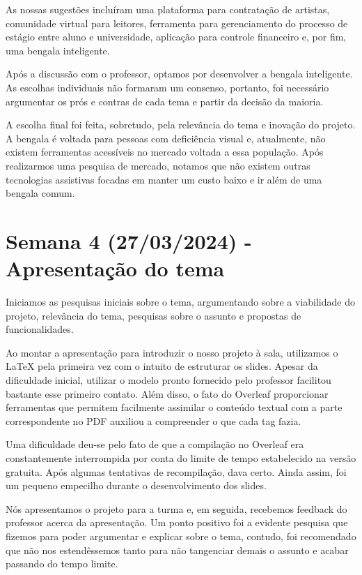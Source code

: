As nossas sugestões incluíram uma plataforma para contratação de artistas, comunidade virtual para leitores, ferramenta para gerenciamento do processo de estágio entre aluno e universidade, aplicação para controle financeiro e, por fim, uma bengala inteligente.

Após a discussão com o professor, optamos por desenvolver a bengala inteligente. As escolhas individuais não formaram um consenso, portanto, foi necessário argumentar os prós e contras de cada tema e partir da decisão da maioria.

A escolha final foi feita, sobretudo, pela relevância do tema e inovação do projeto. A bengala é voltada para pessoas com deficiência visual e, atualmente, não existem ferramentas acessíveis no mercado voltada a essa população. Após realizarmos uma pesquisa de mercado, notamos que não existem outras tecnologias assistivas focadas em manter um custo baixo e ir além de uma bengala comum.


\section{Semana 4 (27/03/2024)  - Apresentação do tema }

Iniciamos as pesquisas iniciais sobre o tema, argumentando sobre a viabilidade do projeto, relevância do tema, pesquisas sobre o assunto e propostas de funcionalidades.

Ao montar a apresentação para introduzir o nosso projeto à sala, utilizamos o LaTeX pela primeira vez com o intuito de estruturar os slides. Apesar da dificuldade inicial, utilizar o modelo pronto fornecido pelo professor facilitou bastante esse primeiro contato. Além disso, o fato do Overleaf proporcionar ferramentas que permitem facilmente assimilar o conteúdo textual com a parte correspondente no PDF auxiliou a compreender o que cada tag fazia.

Uma dificuldade deu-se pelo fato de que a compilação no Overleaf era constantemente interrompida por conta do limite de tempo estabelecido na versão gratuita. Após algumas tentativas de recompilação, dava certo. Ainda assim, foi um pequeno empecilho durante o desenvolvimento dos slides.

Nós apresentamos o projeto para a turma e, em seguida, recebemos feedback do professor acerca da apresentação. Um ponto positivo foi a evidente pesquisa que fizemos para poder argumentar e explicar sobre o tema, contudo, foi recomendado que não nos estendêssemos tanto para não tangenciar demais o assunto e acabar passando do tempo limite.

